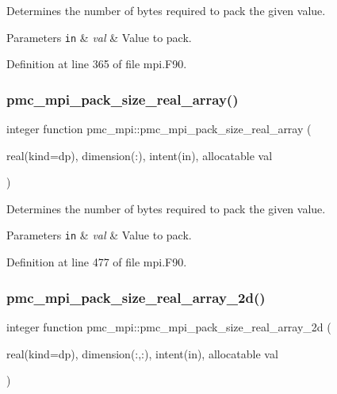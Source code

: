 Determines the number of bytes required to pack the given value. 


\begin{DoxyParams}[1]{Parameters}
\mbox{\tt in}  & {\em val} & Value to pack. \\
\hline
\end{DoxyParams}


Definition at line 365 of file mpi.\+F90.

\mbox{\label{namespacepmc__mpi_a6f2847e4b691b9ab8e007da1adb6c54c}} 
\subsubsection{\texorpdfstring{pmc\+\_\+mpi\+\_\+pack\+\_\+size\+\_\+real\+\_\+array()}{pmc\_mpi\_pack\_size\_real\_array()}}
{\footnotesize\ttfamily integer function pmc\+\_\+mpi\+::pmc\+\_\+mpi\+\_\+pack\+\_\+size\+\_\+real\+\_\+array (\begin{DoxyParamCaption}\item[{real(kind=dp), dimension(\+:), intent(in), allocatable}]{val }\end{DoxyParamCaption})}



Determines the number of bytes required to pack the given value. 


\begin{DoxyParams}[1]{Parameters}
\mbox{\tt in}  & {\em val} & Value to pack. \\
\hline
\end{DoxyParams}


Definition at line 477 of file mpi.\+F90.

\mbox{\label{namespacepmc__mpi_a2a1623c5cced2ab99048a47dda8c00f1}} 
\subsubsection{\texorpdfstring{pmc\+\_\+mpi\+\_\+pack\+\_\+size\+\_\+real\+\_\+array\+\_\+2d()}{pmc\_mpi\_pack\_size\_real\_array\_2d()}}
{\footnotesize\ttfamily integer function pmc\+\_\+mpi\+::pmc\+\_\+mpi\+\_\+pack\+\_\+size\+\_\+real\+\_\+array\+\_\+2d (\begin{DoxyParamCaption}\item[{real(kind=dp), dimension(\+:,\+:), intent(in), allocatable}]{val }\end{DoxyParamCaption})}



